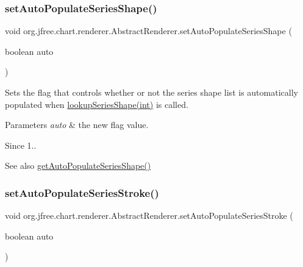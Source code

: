 \subsubsection{\texorpdfstring{set\+Auto\+Populate\+Series\+Shape()}{setAutoPopulateSeriesShape()}}
{\footnotesize\ttfamily void org.\+jfree.\+chart.\+renderer.\+Abstract\+Renderer.\+set\+Auto\+Populate\+Series\+Shape (\begin{DoxyParamCaption}\item[{boolean}]{auto }\end{DoxyParamCaption})}

Sets the flag that controls whether or not the series shape list is automatically populated when \mbox{\hyperlink{classorg_1_1jfree_1_1chart_1_1renderer_1_1_abstract_renderer_ac5a0b8a1c0dea1813cfbbf36e7cbbd10}{lookup\+Series\+Shape(int)}} is called.


\begin{DoxyParams}{Parameters}
{\em auto} & the new flag value.\\
\hline
\end{DoxyParams}
\begin{DoxySince}{Since}
1..
\end{DoxySince}
\begin{DoxySeeAlso}{See also}
\mbox{\hyperlink{classorg_1_1jfree_1_1chart_1_1renderer_1_1_abstract_renderer_ad675c5f6d25fc7e964ce4d64fdd3225d}{get\+Auto\+Populate\+Series\+Shape()}} 
\end{DoxySeeAlso}
\mbox{\label{classorg_1_1jfree_1_1chart_1_1renderer_1_1_abstract_renderer_aa6fc1f6e57125ab3c30523424b3123bd}} 
\subsubsection{\texorpdfstring{set\+Auto\+Populate\+Series\+Stroke()}{setAutoPopulateSeriesStroke()}}
{\footnotesize\ttfamily void org.\+jfree.\+chart.\+renderer.\+Abstract\+Renderer.\+set\+Auto\+Populate\+Series\+Stroke (\begin{DoxyParamCaption}\item[{boolean}]{auto }\end{DoxyParamCaption})}

